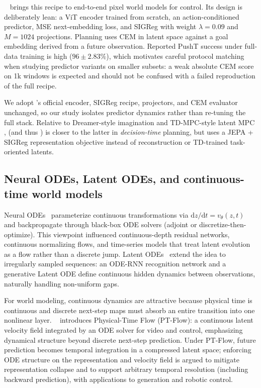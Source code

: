 \LeWM{}~\cite{maes2026lewm} brings this recipe to end-to-end pixel
world models for control.
Its design is deliberately lean: a ViT encoder trained from scratch,
an action-conditioned predictor, MSE next-embedding loss, and SIGReg
with weight $\lambda{=}0.09$ and $M{=}1024$ projections.
Planning uses CEM in latent space against a goal embedding derived
from a future observation.
Reported PushT success under full-data training is high
($96{\pm}2.83\%$), which motivates careful protocol matching when
studying predictor variants on smaller subsets: a weak absolute CEM
score on 1k windows is expected and should not be confused with a
failed reproduction of the full recipe.

We adopt \LeWM{}'s official encoder, SIGReg recipe, projectors, and CEM
evaluator unchanged, so our study isolates predictor dynamics rather
than re-tuning the full stack.
Relative to Dreamer-style imagination
\cite{hafner2020dreamer,hafner2023dreamerv3} and TD-MPC-style latent
MPC \cite{hansen2022tdmpc}, \LeWM{} (and thus \method{}) is closer to
the latter in \emph{decision-time} planning, but uses a JEPA + SIGReg
representation objective instead of reconstruction or TD-trained
task-oriented latents.

\subsection{Neural ODEs, Latent ODEs, and continuous-time world models}
\label{sec:rel-ode}

Neural ODEs~\cite{chen2018neuralode} parameterize continuous
transformations via $\mathrm{d}z/\mathrm{d}t = v_\theta(z,t)$ and
backpropagate through black-box ODE solvers (adjoint or
discretize-then-optimize).
This viewpoint influenced continuous-depth residual networks,
continuous normalizing flows, and time-series models that treat
latent evolution as a flow rather than a discrete jump.
Latent ODEs~\cite{rubanova2019latentode} extend the idea to
irregularly sampled sequences: an ODE-RNN recognition network and a
generative Latent ODE define continuous hidden dynamics between
observations, naturally handling non-uniform gaps.

For world modeling, continuous dynamics are attractive because
physical time is continuous and discrete next-step maps must absorb
an entire transition into one nonlinear layer.
\PriorODEWorld{}~\cite{liu2026odeworld} introduces Physical-Time Flow
(PT-Flow): a continuous latent velocity field integrated by an ODE
solver for video and control, emphasizing dynamical structure beyond
discrete next-step prediction.
Under PT-Flow, future prediction becomes temporal integration in a
compressed latent space; enforcing ODE structure on the
representation and velocity field is argued to mitigate representation
collapse and to support arbitrary temporal resolution (including
backward prediction), with applications to generation and robotic
control.

